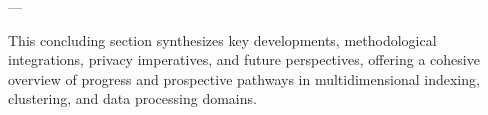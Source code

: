 \documentclass[11pt]{article}
\begin{document}
---

This concluding section synthesizes key developments, methodological integrations, privacy imperatives, and future perspectives, offering a cohesive overview of progress and prospective pathways in multidimensional indexing, clustering, and data processing domains.




\end{document}
